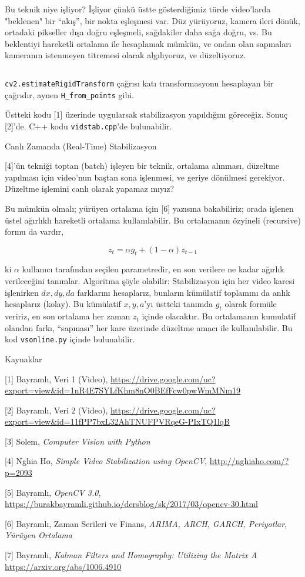 \documentclass[12pt,fleqn]{article}\usepackage{../../common}
\begin{document}
Bu teknik niye işliyor? İşliyor çünkü üstte gösterdiğimiz türde video'larda
"beklenen" bir ``akış'', bir nokta eşleşmesi var. Düz yürüyoruz, kamera
ileri dönük, ortadaki pikseller dışa doğru eşleşmeli, sağdakiler daha sağa
doğru, vs.  Bu beklentiyi hareketli ortalama ile hesaplamak mümkün, ve
ondan olan sapmaları kameranın istenmeyen titremesi olarak algılıyoruz, ve
düzeltiyoruz.

\inputminted[fontsize=\footnotesize]{python}{vidstab.py}

\verb!cv2.estimateRigidTransform! çağrısı katı transformasyonu hesaplayan
bir çağrıdır, aynen \verb!H_from_points! gibi. 

Üstteki kodu [1] üzerinde uygularsak stabilizasyon yapıldığını
göreceğiz. Sonuç [2]'de. C++ kodu \verb!vidstab.cpp!'de bulunabilir.

Canlı Zamanda (Real-Time) Stabilizasyon

[4]'ün tekniği toptan (batch) işleyen bir teknik, ortalama alınması,
düzeltme yapılması için video'nun baştan sona işlenmesi, ve geriye
dönülmesi gerekiyor. Düzeltme işlemini canlı olarak yapamaz mıyız?

Bu mümkün olmalı; yürüyen ortalama için [6] yazısına bakabiliriz;
orada işlenen üstel ağırlıklı hareketli ortalama kullanılabilir. Bu
ortalamanın özyineli (recursive) formu da vardır,

$$ z_t = \alpha g_t + (1-\alpha) z_{t-1}$$

ki $\alpha$ kullanıcı tarafından seçilen parametredir, en son verilere ne
kadar ağırlık verileceğini tanımlar. Algoritma şöyle olabilir:
Stabilizasyon için her video karesi işlenirken $dx,dy,da$ farklarını
hesaplarız, bunların kümülatif toplamını da anlık hesaplarız (kolay). Bu
kümülatif $x,y,a$'yı üstteki tanımda $g_t$ olarak formüle veririz, en son
ortalama her zaman $z_t$ içinde olacaktır. Bu ortalamanın kumulatif olandan
farkı, ``sapması'' her kare üzerinde düzeltme amacı ile kullanılabilir. Bu
kod \verb!vsonline.py! içinde bulunabilir.

Kaynaklar

[1] Bayramlı, Veri 1 (Video), \url{https://drive.google.com/uc?export=view&id=1nR4E7SYLfKhm8nO0BEfFcw0pwWmMNm19}

[2] Bayramlı, Veri 2 (Video), \url{https://drive.google.com/uc?export=view&id=11fPP7bxL32AhTNUFPVRqeG-PIxTQ1lqB}

[3] Solem, {\em Computer Vision with Python}

[4] Nghia Ho, {\em Simple Video Stabilization using OpenCV},
    \url{http://nghiaho.com/?p=2093}

[5] Bayramlı, {\em OpenCV 3.0}, 
    \url{https://burakbayramli.github.io/dersblog/sk/2017/03/opencv-30.html}

[6] Bayramlı, Zaman Serileri ve Finans, {\em ARIMA, ARCH, GARCH, Periyotlar, Yürüyen Ortalama}

[7] Bayramlı, {\em Kalman Filters and Homography: Utilizing the Matrix A}
    \url{https://arxiv.org/abs/1006.4910}


    
\end{document}

